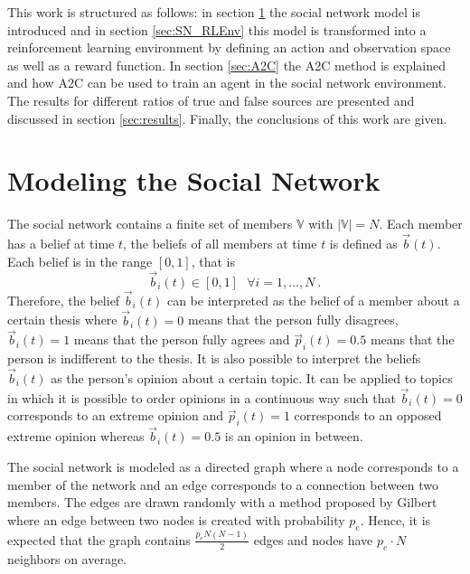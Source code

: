 \documentclass[11pt, a4paper]{article}
\begin{document}
This work is structured as follows: in section \ref{sec:SN} the social network model is introduced and in section \ref{sec:SN_RLEnv} this model is transformed into a reinforcement learning environment by defining an action and observation space as well as a reward function. In section \ref{sec:A2C} the A2C method is explained and how A2C can be used to train an agent in the social network environment. The results for different ratios of true and false sources are presented and discussed in section \ref{sec:results}. Finally, the conclusions of this work are given.

\section{Modeling the Social Network} \label{sec:SN}
The social network contains a finite set of members $\mathbb{V}$ with $|\mathbb{V}| = N$. Each member has a belief at time $t$, the beliefs of all members at time $t$ is defined as $\vec{b}(t)$. Each belief is in the range $[0,1]$, that is 
%
\begin{equation}
\vec{b}_i(t) \in [0,1] \ \ \ \forall i = 1,...,N \ .
\end{equation}
%
Therefore, the belief $\vec{b}_i(t)$ can be interpreted as the belief of a member about a certain thesis where $	\vec{b}_i(t) = 0$ means that the person fully disagrees, $\vec{b}_i(t) = 1$ means that the person fully agrees and $\vec{p}_i(t) = 0.5$ means that the person is indifferent to the thesis. It is also possible to interpret the beliefs $\vec{b}_i(t)$ as the person's opinion about a certain topic. It can be applied to topics in which it is possible to order opinions in a continuous way such that $\vec{b}_i(t) = 0$ corresponds to an extreme opinion and $\vec{p}_i(t) = 1$ corresponds to an opposed extreme opinion whereas $\vec{b}_i(t) = 0.5$ is an opinion in between. \newline

The social network is modeled as a directed graph where a node corresponds to a member of the network and an edge corresponds to a connection between two members. The edges are drawn randomly with a method proposed by Gilbert \cite{random_graphs} where an edge between two nodes is created with probability $p_{e}$. Hence, it is expected that the graph contains $\frac{p_{e}N(N-1)}{2}$ edges and nodes have $p_{e}\cdot N$ neighbors on average.\newline
\end{document}
